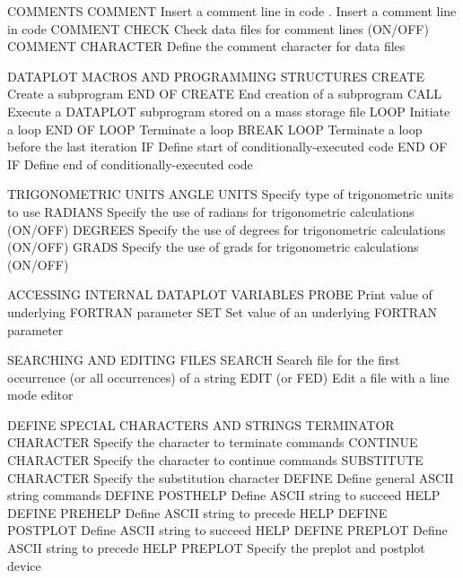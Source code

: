 COMMENTS
   COMMENT                 Insert a comment line in code
   .                       Insert a comment line in code
   COMMENT CHECK           Check data files for comment lines (ON/OFF)
   COMMENT CHARACTER       Define the comment character for data files
 
DATAPLOT MACROS AND PROGRAMMING STRUCTURES
   CREATE                  Create a subprogram
   END OF CREATE           End creation of a subprogram
   CALL                    Execute a DATAPLOT subprogram stored on a
                           mass storage file
   LOOP                    Initiate a loop
   END OF LOOP             Terminate a loop
   BREAK LOOP              Terminate a loop before the last iteration
   IF                      Define start of conditionally-executed code
   END OF IF               Define end of conditionally-executed code
 
TRIGONOMETRIC UNITS
   ANGLE UNITS             Specify type of trigonometric units to use
   RADIANS                 Specify the use of radians for
                           trigonometric calculations (ON/OFF)
   DEGREES                 Specify the use of degrees for
                           trigonometric calculations (ON/OFF)
   GRADS                   Specify the use of grads for
                           trigonometric calculations (ON/OFF)
 
ACCESSING INTERNAL DATAPLOT VARIABLES
   PROBE                   Print value of underlying FORTRAN parameter
   SET                     Set value of an underlying FORTRAN parameter
 
SEARCHING AND EDITING FILES
   SEARCH                  Search file for the first occurrence (or all
                           occurrences) of a string
   EDIT (or FED)           Edit a file with a line mode editor
 
DEFINE SPECIAL CHARACTERS AND STRINGS
   TERMINATOR  CHARACTER   Specify the character to terminate commands
   CONTINUE CHARACTER      Specify the character to continue commands
   SUBSTITUTE CHARACTER    Specify the substitution character
   DEFINE                  Define general ASCII string commands
   DEFINE POSTHELP         Define ASCII string to succeed HELP
   DEFINE PREHELP          Define ASCII string to precede HELP
   DEFINE POSTPLOT         Define ASCII string to succeed HELP
   DEFINE PREPLOT          Define ASCII string to precede HELP
   PREPLOT                 Specify the preplot and postplot device
 
